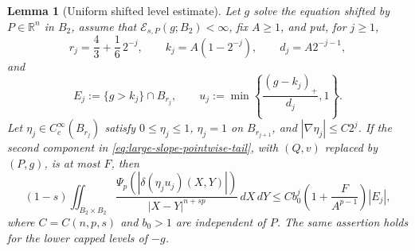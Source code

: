 \documentclass[11pt,reqno]{amsart}
\numberwithin{equation}{section}
\newcommand{\R}{\mathbb R}
\newcommand{\dd}{\,d}
\newtheorem{lemma}[theorem]{Lemma}
\theoremstyle{remark}
\begin{document}
\begin{lemma}[Uniform shifted level estimate]
\label{lem:uniform-shifted-level-estimate}
Let \(g\) solve the equation shifted by \(P\in\R^n\) in \(B_2\), assume
that \(\mathcal E_{s,P}(g;B_2)<\infty\), fix \(A\ge1\), and put, for
\(j\ge1\),
\begin{equation*}
 r_j=\frac43+\frac16\,2^{-j},\qquad
 k_j=A(1-2^{-j}),\qquad d_j=A2^{-j-1},
\end{equation*}
and
\begin{equation*}
 E_j:=\{g>k_j\}\cap B_{r_j},\qquad
 u_j:=\min\left\{\frac{(g-k_j)_+}{d_j},1\right\}.
\end{equation*}
Let \(\eta_j\in C_c^\infty(B_{r_j})\) satisfy
\(0\le\eta_j\le1\), \(\eta_j=1\) on \(B_{r_{j+1}}\), and
\(|\nabla\eta_j|\le C2^j\).  If the second component in
\eqref{eq:large-slope-pointwise-tail}, with \((Q,v)\) replaced by
\((P,g)\), is at most \(F\), then
\begin{equation}
 (1-s)\iint_{B_2\times B_2}
 \frac{\Psi_p(|\delta(\eta_ju_j)(X,Y)|)}
 {|X-Y|^{n+sp}}\dd X\!\dd Y
 \le Cb_0^j\left(1+\frac{F}{A^{p-1}}\right)|E_j|,
 \label{eq:uniform-shifted-level-estimate}
\end{equation}
where \(C=C(n,p,s)\) and \(b_0>1\) are independent of \(P\).
The same assertion holds for the lower capped levels of \(-g\).
\end{lemma}
\end{document}
